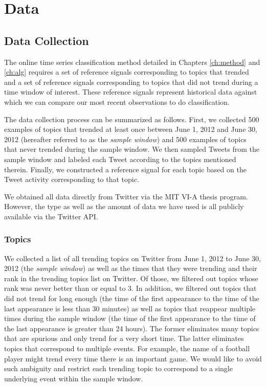\section{Data}
\subsection{Data Collection}
The online time series classification method detailed in Chapters
\ref{ch:method} and \ref{ch:alg} requires a set of reference signals
corresponding to topics that trended and a set of reference signals
corresponding to topics that did not trend during a time window of
interest. These reference signals represent historical data against which we can
compare our most recent observations to do classification.

The data collection process can be summarized as follows. First, we collected
500 examples of topics that trended at least once between June 1, 2012 and June
30, 2012 (hereafter referred to as the {\em sample window}) and 500 examples of
topics that never trended during the sample window. We then sampled Tweets from the
sample window and labeled each Tweet according to the topics mentioned
therein. Finally, we constructed a reference signal for each topic based on the
Tweet activity corresponding to that topic.

We obtained all data directly from Twitter via the MIT VI-A thesis
program. However, the type as well as the amount of data we have used is all
publicly available via the Twitter API.

\subsubsection{Topics}
We collected a list of all trending topics on Twitter from June 1, 2012 to June
30, 2012 (the {\em sample window}) as well as the times that they were trending
and their rank in the trending topics list on Twitter. Of those, we filtered out
topics whose rank was never better than or equal to 3. In addition, we filtered
out topics that did not trend for long enough (the time of the first appearance
to the time of the last appearance is less than 30 minutes) as well as topics
that reappear multiple times during the sample window (the time of the first
appearance to the time of the last appearance is greater than 24 hours). The
former eliminates many topics that are spurious and only trend for a very short
time. The latter eliminates topics that correspond to multiple events. For
example, the name of a football player might trend every time there is an
important game. We would like to avoid such ambiguity and restrict each trending
topic to correspond to a single underlying event within the sample window.

